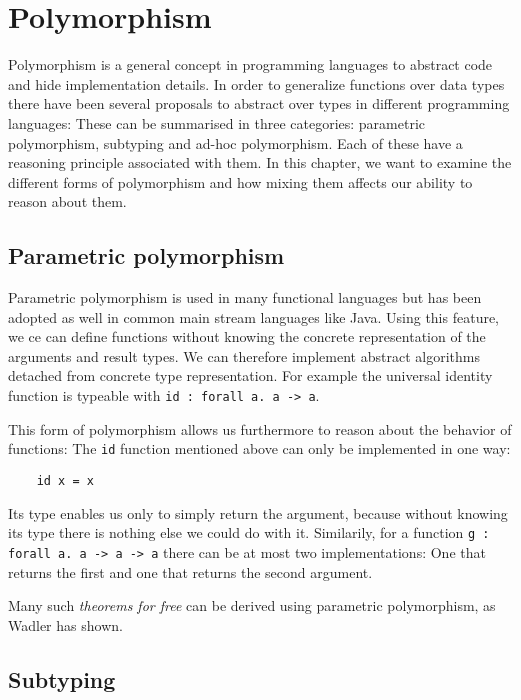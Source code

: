 \chapter{Polymorphism}\label{ch:polymorphism}

Polymorphism is a general concept in programming languages to abstract code and hide implementation details.
In order to generalize functions over data types there have been several proposals to abstract over types in different programming languages:
These can be summarised in three categories: parametric polymorphism, subtyping and ad-hoc polymorphism.
Each of these have a reasoning principle associated with them.
In this chapter, we want to examine the different forms of polymorphism and how mixing them affects our ability to reason about them.

\section{Parametric polymorphism}\label{sec:parmetric-polymorphism}

Parametric polymorphism is used in many functional languages but has been adopted as well in common main stream languages like Java.
Using this feature, we ce can define functions without knowing the concrete representation of the arguments and result types.
We can therefore implement abstract algorithms detached from concrete type representation.
For example the universal identity function is typeable with \texttt{id : forall a. a -> a}.

This form of polymorphism allows us furthermore to reason about the behavior of functions:
The \texttt{id} function mentioned above can only be implemented in one way:

\begin{lstlisting}
    id x = x
\end{lstlisting}

Its type enables us only to simply return the argument, because without knowing its type there is nothing else we could do with it.
Similarily, for a function \texttt{g : forall a. a -> a -> a} there can be at most two implementations:
One that returns the first and one that returns the second argument.

Many such \emph{theorems for free} can be derived using parametric polymorphism, as Wadler has shown. \cite{wadlertheorems}

\section{Subtyping}\label{sec:subtyping}

